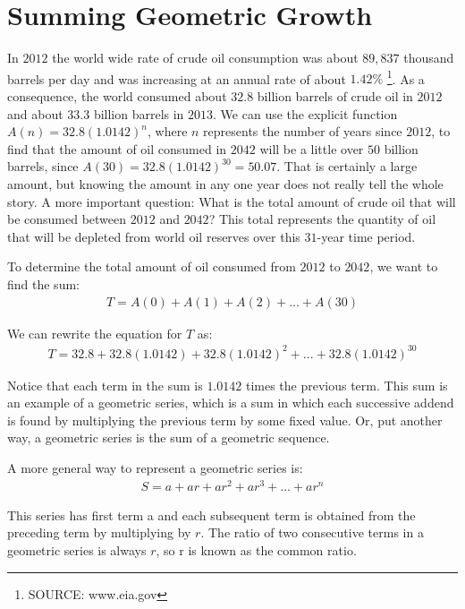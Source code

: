 \documentclass[10pt,]{book}
\theoremstyle{plain}
\theoremstyle{definition}
\theoremstyle{definition}
\theoremstyle{definition}
\numberwithin{equation}{section}
\begin{document}
\section[{Summing Geometric Growth}]{Summing Geometric Growth}\label{chapter04-section04}
In \(2012\) the world wide rate of crude oil consumption was about \(89,837\) thousand barrels per day and was increasing at an annual rate of about \(1.42\%\) \footnote{SOURCE: www.eia.gov\label{fn-1}}.  As a consequence, the world consumed about \(32.8\) billion barrels of crude oil in \(2012\) and about \(33.3\) billion barrels in \(2013\).  We can use the explicit function \(A(n)=32.8(1.0142)^n\), where \(n\) represents the number of years since \(2012\), to find that the amount of oil consumed in \(2042\) will be a little over \(50\) billion barrels, since \(A(30)=32.8(1.0142)^30 = 50.07\).  That is certainly a large amount, but knowing the amount in any one year does not really tell the whole story.  A more important question:  What is the total amount of crude oil that will be consumed between \(2012\) and \(2042\)?  This total represents the quantity of oil that will be depleted from world oil reserves over this \(31\)-year time period.%
\par
To determine the total amount of oil consumed from \(2012\) to \(2042\), we want to find the sum:%
\begin{gather*}
T=A(0)+A(1)+A(2)+...+A(30)
\end{gather*}
%
\par
We can rewrite the equation for \(T\) as:%
\begin{gather*}
T=32.8+32.8(1.0142)+32.8(1.0142)^2+...+32.8(1.0142)^{30}
\end{gather*}
%
\par
Notice that each term in the sum is \(1.0142\) times the previous term. This sum is an example of a geometric series, which is a sum in which each successive addend is found by multiplying the previous term by some fixed value. Or, put another way, a geometric series is the sum of a geometric sequence.%
\par
A more general way to represent a geometric series is:%
\begin{gather}
S = a + ar + ar^2 + ar^3 + ... + ar^n\label{chapter04-section04-geoseries-step1}
\end{gather}
%
\par
This series has first term a and each subsequent term is obtained from the preceding term by multiplying by \(r\). The ratio of two consecutive terms in a geometric series is always \(r\), so r is known as the common ratio.%
\end{document}
